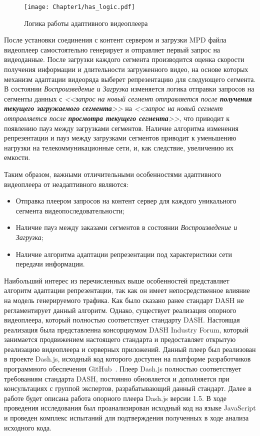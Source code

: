 \begin{figure}[htbp]
\begin{center}
\texttt{[image: Chapter1/has\_logic.pdf]}
\caption{Логика работы адаптивного видеоплеера}
\label{fig:has_logic}
\end{center}
\end{figure}

После установки соединения с контент сервером и загрузки MPD файла видеоплеер самостоятельно генерирует и отправляет первый запрос на видеоданные. После загрузки каждого сегмента производится оценка скорости получения информации и длительности загруженного видео, на основе которых механизм адаптации видеоряда выберет репрезентацию для следующего сегмента. В состоянии \textit{Воспроизведение и Загрузка} изменяется логика отправки запросов на сегменты данных с \textit{<<запрос на новый сегмент отправляется после \textbf{получения текущего загружаемого сегмента}>>} на \textit{<<запрос на новый сегмент отправляется после \textbf{просмотра текущего сегмента}>>}, что приводит к появлению пауз между загрузками сегментов. Наличие алгоритма изменения репрезентации и пауз между загрузками сегментов приводит к уменьшению нагрузки на телекоммуникационные сети, и, как следствие, увеличению их емкости.

Таким образом, важными отличительными особенностями адаптивного видеоплеера от неадаптивного являются:
\begin{itemize}
  \item Отправка плеером запросов на контент сервер для каждого уникального сегмента видеопоследовательности;
  \item Наличие пауз между заказами сегментов в состоянии \textit{Воспроизведение и Загрузка};
  \item Наличие алгоритма адаптации репрезентации под характеристики сети передачи информации.
\end{itemize}

Наибольший интерес из перечисленных выше особенностей представляет алгоритм адаптации репрезентации, так как он имеет непосредственное влияние на модель генерируемого трафика. Как было сказано ранее стандарт DASH не регламентирует данный алгоритм. Однако, существует реализация опорного видеоплеера, который полностью соответствует стандарту DASH. Настоящая реализация была представленна консорциумом DASH Industry Forum, который занимается продвижением настоящего стандарта и предоставляет открытую реализацию видеоплеера и серверных приложений. Данный плеер был реализован в проекте Dash.js, исходный код которого доступен на платформе разработчиков программного обеспечения GitHub~\cite{DashJS}. Плеер Dash.js полностью соответствует требованиям стандарта DASH, постоянно обновляется и дополняется при консультациях с группой экспертов, разрабатывающий данный стандарт. Далее в работе будет описана работа опорного плеера Dash.js версии 1.5. В ходе проведения исследования был проанализирован исходный код на языке JavaScript и проведен комплекс испытаний для подтверждения полученных в ходе анализа исходного кода.

